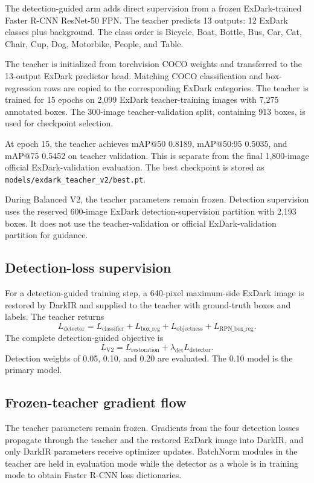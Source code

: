 The detection-guided arm adds direct supervision from a frozen
ExDark-trained Faster R-CNN ResNet-50 FPN. The teacher predicts 13 outputs:
12 ExDark classes plus background. The class order is Bicycle, Boat,
Bottle, Bus, Car, Cat, Chair, Cup, Dog, Motorbike, People, and Table.

The teacher is initialized from torchvision COCO weights and transferred
to the 13-output ExDark predictor head. Matching COCO classification and
box-regression rows are copied to the corresponding ExDark categories.
The teacher is trained for 15 epochs on 2,099 ExDark teacher-training
images with 7,275 annotated boxes. The 300-image teacher-validation split,
containing 913 boxes, is used for checkpoint selection.

At epoch 15, the teacher achieves mAP@50 0.8189, mAP@50:95 0.5035, and
mAP@75 0.5452 on teacher validation. This is separate from the final
1,800-image official ExDark-validation evaluation. The best checkpoint is
stored as \texttt{models/exdark\_teacher\_v2/best.pt}.

During Balanced V2, the teacher parameters remain frozen. Detection
supervision uses the reserved 600-image ExDark detection-supervision
partition with 2,193 boxes. It does not use the teacher-validation or
official ExDark-validation partition for guidance.

\subsection{Detection-loss supervision}

For a detection-guided training step, a 640-pixel maximum-side ExDark image
is restored by DarkIR and supplied to the teacher with ground-truth boxes
and labels. The teacher returns
\[
L_{\mathrm{detector}}
=
L_{\mathrm{classifier}}
+
L_{\mathrm{box\_reg}}
+
L_{\mathrm{objectness}}
+
L_{\mathrm{RPN\_box\_reg}}.
\]
The complete detection-guided objective is
\[
L_{\mathrm{V2}}
=
L_{\mathrm{restoration}}
+
\lambda_{\mathrm{det}}L_{\mathrm{detector}}.
\]
Detection weights of 0.05, 0.10, and 0.20 are evaluated. The 0.10 model is
the primary model.

\subsection{Frozen-teacher gradient flow}

The teacher parameters remain frozen. Gradients from the four detection
losses propagate through the teacher and the restored ExDark image into
DarkIR, and only DarkIR parameters receive optimizer updates. BatchNorm
modules in the teacher are held in evaluation mode while the detector as a
whole is in training mode to obtain Faster R-CNN loss dictionaries.

